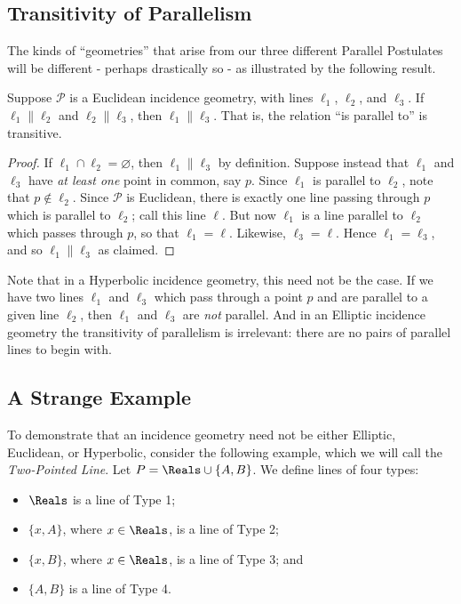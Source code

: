 \documentclass{article}
\begin{document}
\subsection*{Transitivity of Parallelism}

The kinds of ``geometries'' that arise from our three different Parallel Postulates will be different - perhaps drastically so - as illustrated by the following result.

\begin{prop}
Suppose $\mathcal{P}$ is a Euclidean incidence geometry, with lines $\ell_1$, $\ell_2$, and $\ell_3$. If $\ell_1 \parallel \ell_2$ and $\ell_2 \parallel \ell_3$, then $\ell_1 \parallel \ell_3$. That is, the relation ``is parallel to'' is transitive.
\end{prop}

\begin{proof}
If $\ell_1 \cap \ell_2 = \varnothing$, then $\ell_1 \parallel \ell_3$ by definition. Suppose instead that $\ell_1$ and $\ell_3$ have \emph{at least one} point in common, say $p$. Since $\ell_1$ is parallel to $\ell_2$, note that $p \notin \ell_2$. Since $\mathcal{P}$ is Euclidean, there is exactly one line passing through $p$ which is parallel to $\ell_2$; call this line $\ell$. But now $\ell_1$ is a line parallel to $\ell_2$ which passes through $p$, so that $\ell_1 = \ell$. Likewise, $\ell_3 = \ell$. Hence $\ell_1 = \ell_3$, and so $\ell_1 \parallel \ell_3$ as claimed.
\end{proof}

Note that in a Hyperbolic incidence geometry, this need not be the case. If we have two lines $\ell_1$ and $\ell_3$ which pass through a point $p$ and are parallel to a given line $\ell_2$, then $\ell_1$ and $\ell_3$ are \emph{not} parallel. And in an Elliptic incidence geometry the transitivity of parallelism is irrelevant: there are no pairs of parallel lines to begin with.



\subsection*{A Strange Example}

To demonstrate that an incidence geometry need not be either Elliptic, Euclidean, or Hyperbolic, consider the following example, which we will call the \emph{Two-Pointed Line}. Let $P = \Reals \cup \{ A, B \}$. We define lines of four types:
\begin{itemize}
\item $\Reals$ is a line of Type 1;
\item $\{x, A\}$, where $x \in \Reals$, is a line of Type 2;
\item $\{x, B\}$, where $x \in \Reals$, is a line of Type 3; and
\item $\{A, B\}$ is a line of Type 4.
\end{itemize}
\end{document}
